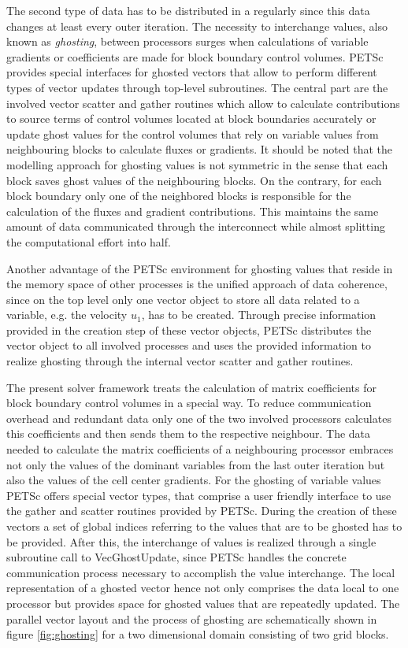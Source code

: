 The second type of data has to be distributed in a regularly since this data changes at least every outer iteration. The necessity to interchange values, also known as \emph{ghosting}, between processors surges when calculations of variable gradients or coefficients are made for block boundary control volumes. PETSc provides special interfaces for ghosted vectors that allow to perform different types of vector updates through top-level subroutines. The central part are the involved vector scatter and gather routines which allow to calculate contributions to source terms of control volumes located at block boundaries accurately or update ghost values for the control volumes that rely on variable values from neighbouring blocks to calculate fluxes or gradients. It should be noted that the modelling approach for ghosting values is not symmetric in the sense that each block saves ghost values of the neighbouring blocks. On the contrary, for each block boundary only one of the neighbored blocks is responsible for the calculation of the fluxes and gradient contributions. This maintains the same amount of data communicated through the interconnect while almost splitting the computational effort into half.

Another advantage of the PETSc environment for ghosting values that reside in the memory space of other processes is the unified approach of data coherence, since on the top level only one vector object to store all data related to a variable, e.g. the velocity \(u_1\), has to be created. Through precise information provided in the creation step of these vector objects, PETSc distributes the vector object to all involved processes and uses the provided information to realize ghosting through the internal vector scatter and gather routines. 

The present solver framework treats the calculation of matrix coefficients for block boundary control volumes in a special way. To reduce communication overhead and redundant data only one of the two involved processors calculates this coefficients and then sends them to the respective neighbour. The data needed to calculate the matrix coefficients of a neighbouring processor embraces not only the values of the dominant variables from the last outer iteration but also the values of the cell center gradients. For the ghosting of variable values PETSc offers special vector types, that comprise a user friendly interface to use the gather and scatter routines provided by PETSc. During the creation of these vectors a set of global indices referring to the values that are to be ghosted has to be provided. After this, the interchange of values is realized through a single subroutine call to \textrm{VecGhostUpdate}, since PETSc handles the concrete communication process necessary to accomplish the value interchange. The local representation of a ghosted vector hence not only comprises the data local to one processor but provides space for ghosted values that are repeatedly updated. The parallel vector layout and the process of ghosting are schematically shown in figure \ref{fig:ghosting} for a two dimensional domain consisting of two grid blocks.

